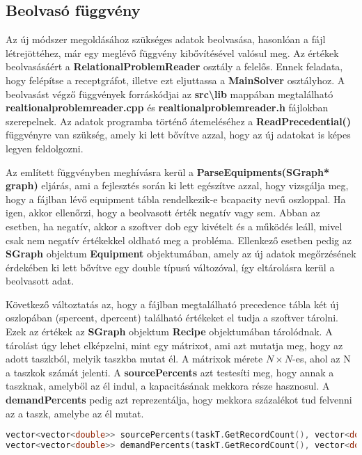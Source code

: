 \subsection{Beolvasó függvény}
Az új módszer megoldásához szükséges adatok beolvasása, hasonlóan a fájl létrejöttéhez, már egy meglévő függvény kibővítésével valósul meg.
Az értékek beolvasásáért a \textbf{RelationalProblemReader} osztály a felelős.
Ennek feladata, hogy felépítse a receptgráfot, illetve ezt eljuttassa a \textbf{MainSolver} osztályhoz.
A beolvasást végző függvények forráskódjai az \textbf{src\textbackslash lib} mappában megtalálható \textbf{realtionalproblemreader.cpp} és \textbf{realtionalproblemreader.h} fájlokban szerepelnek.
Az adatok programba történő átemeléséhez a \textbf{ReadPrecedential()} függvényre van szükség, amely ki lett bővítve azzal, hogy az új adatokat is képes legyen feldolgozni. 

Az említett függvényben meghívásra kerül a \textbf{ParseEquipments(SGraph* graph)} eljárás, ami a fejlesztés során ki lett egészítve azzal, hogy vizsgálja meg, hogy a fájlban lévő equipment tábla rendelkezik-e b\textunderscore capacity nevű oszloppal.
Ha igen, akkor ellenőrzi, hogy a beolvasott érték negatív vagy sem.
Abban az esetben, ha negatív, akkor a szoftver dob egy kivételt és a működés leáll, mivel csak nem negatív értékekkel oldható meg a probléma.
Ellenkező esetben pedig az \textbf{SGraph} objektum \textbf{Equipment} objektumában, amely az új adatok megőrzésének érdekében ki lett bővítve egy double típusú változóval, így eltárolásra kerül a beolvasott adat.

Következő változtatás az, hogy a fájlban megtalálható precedence tábla két új oszlopában (s\textunderscore percent, d\textunderscore percent) található értékeket el tudja a szoftver tárolni.
Ezek az értékek az \textbf{SGraph} objektum \textbf{Recipe} objektumában tárolódnak.
A tárolást úgy lehet elképzelni, mint egy mátrixot, ami azt mutatja meg, hogy az adott taszkból, melyik taszkba mutat él.
A mátrixok mérete $N\times N$-es, ahol az N a taszkok számát jelenti.
A \textbf{sourcePercents} azt testesíti meg, hogy annak a taszknak, amelyből az él indul, a kapacitásának mekkora része hasznosul.
A \textbf{demandPercents} pedig azt reprezentálja, hogy mekkora százalékot tud felvenni az a taszk, amelybe az él mutat.
\begin{lstlisting}[caption={A sourcePercents és a demandPercents változók inicializálása},language=c++,numbers=none]
vector<vector<double>> sourcePercents(taskT.GetRecordCount(), vector<double>(taskT.GetRecordCount(), -1));
vector<vector<double>> demandPercents(taskT.GetRecordCount(), vector<double>(taskT.GetRecordCount(), -1));
\end{lstlisting}

